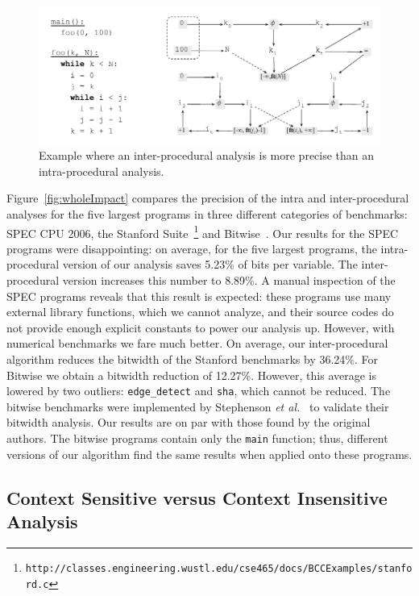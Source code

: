 \documentclass{llncs}
\begin{document}
\begin{figure}[t!]
\begin{center}
\includegraphics[width=\textwidth]{images/intra}
\end{center}
\caption{\label{fig:intra}
Example where an inter-procedural analysis is more precise than an
intra-procedural analysis.
}
\end{figure}

Figure~\ref{fig:wholeImpact} compares the precision of the intra and
inter-procedural analyses for the five largest programs in three different
categories of benchmarks: SPEC CPU 2006, the Stanford Suite~\footnote{\texttt{http://classes.engineering.wustl.edu/cse465/docs/BCCExamples/stanford.c}} and
Bitwise~\cite{Stephenson00}.
Our results for the SPEC programs were disappointing: on average, for
the five largest programs, the intra-procedural version of our analysis saves
5.23\% of bits per variable.
The inter-procedural version increases this number to 8.89\%.
A manual inspection of the SPEC programs reveals that this result is expected:
these programs use many external library functions, which we cannot analyze, and
their source codes do not provide enough explicit constants to power our analysis
up.
However, with numerical benchmarks we fare much better.
On average, our inter-procedural algorithm reduces the bitwidth of the
Stanford benchmarks by 36.24\%.
For Bitwise we obtain a bitwidth reduction of 12.27\%.
However, this average is lowered by two outliers: \texttt{edge\_detect} and
\texttt{sha}, which cannot be reduced.
The bitwise benchmarks were implemented by Stephenson
{\em et al.}~\cite{Stephenson00} to validate their bitwidth analysis.
Our results are on par with those found by the original authors.
The bitwise programs contain only the \texttt{main} function; thus, different
versions of our algorithm find the same results when applied onto these
programs.

\subsection{Context Sensitive versus Context Insensitive Analysis}
\label{sub:context}
\end{document}
